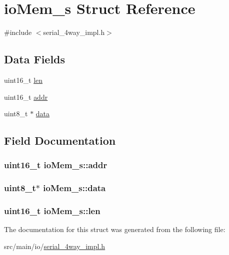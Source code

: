 \hypertarget{structioMem__s}{\section{io\+Mem\+\_\+s Struct Reference}
\label{structioMem__s}
}


{\ttfamily \#include $<$serial\+\_\+4way\+\_\+impl.\+h$>$}

\subsection*{Data Fields}
\begin{DoxyCompactItemize}
\item 
uint16\+\_\+t \hyperlink{structioMem__s_ac673a563d0f1749f4bb3c0fbc96e514c}{len}
\item 
uint16\+\_\+t \hyperlink{structioMem__s_aac38b78bfb92c0ab0e8729553e070db2}{addr}
\item 
uint8\+\_\+t $\ast$ \hyperlink{structioMem__s_a9133cd7d74e7db730758e98f098b722f}{data}
\end{DoxyCompactItemize}


\subsection{Field Documentation}
\hypertarget{structioMem__s_aac38b78bfb92c0ab0e8729553e070db2}{
\subsubsection[{addr}]{\setlength{\rightskip}{0pt plus 5cm}uint16\+\_\+t io\+Mem\+\_\+s\+::addr}}\label{structioMem__s_aac38b78bfb92c0ab0e8729553e070db2}
\hypertarget{structioMem__s_a9133cd7d74e7db730758e98f098b722f}{
\subsubsection[{data}]{\setlength{\rightskip}{0pt plus 5cm}uint8\+\_\+t$\ast$ io\+Mem\+\_\+s\+::data}}\label{structioMem__s_a9133cd7d74e7db730758e98f098b722f}
\hypertarget{structioMem__s_ac673a563d0f1749f4bb3c0fbc96e514c}{
\subsubsection[{len}]{\setlength{\rightskip}{0pt plus 5cm}uint16\+\_\+t io\+Mem\+\_\+s\+::len}}\label{structioMem__s_ac673a563d0f1749f4bb3c0fbc96e514c}


The documentation for this struct was generated from the following file\+:\begin{DoxyCompactItemize}
\item 
src/main/io/\hyperlink{serial__4way__impl_8h}{serial\+\_\+4way\+\_\+impl.\+h}\end{DoxyCompactItemize}
